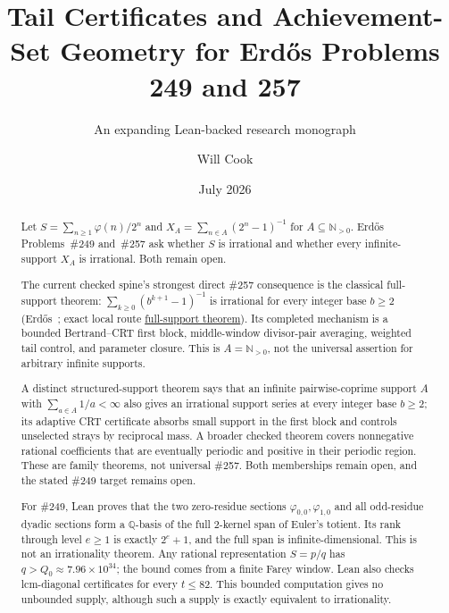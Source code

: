 \documentclass[11pt]{article}
\title{Tail Certificates and Achievement-Set Geometry for Erd\H{o}s Problems 249 and 257}
\subtitle{An expanding Lean-backed research monograph}
\author{Will Cook}
\date{July 2026}
\newcommand{\commit}{bb4e24651b37cd096d3749ef299c3317930b3a3b}
\newcommand{\repobase}{https://github.com/wcook04/plectis-lean-erdos249-257/blob/\commit}
\newcommand{\PK}{Erdos249257}
\newcommand{\lword}[4]{\href{\repobase/\PK/#1\#L#2}{#4}}
\theoremstyle{definition}
\theoremstyle{remark}
\newcommand{\Npos}{\mathbb{N}_{>0}}
\newcommand{\Q}{\mathbb{Q}}
\newcommand{\ph}{\varphi}
\newcommand{\Qzero}{Q_0}
\begin{document}
\maketitle
{}

\begin{abstract}
\noindent
Let $S=\sum_{n\ge1}\ph(n)/2^n$ and
$X_A=\sum_{n\in A}(2^n-1)^{-1}$ for $A\subseteq\Npos$. Erd\H{o}s
Problems~\#249 and~\#257 ask whether $S$ is irrational and whether every
infinite-support $X_A$ is irrational. Both remain open.

The current checked spine's strongest direct \#257 consequence is the classical
full-support theorem: $\sum_{k\ge0}(b^{k+1}-1)^{-1}$ is irrational for every
integer base $b\ge2$ (Erd\H{o}s~\cite{erdos1948}; exact local route
\lword{CertificateKernel.lean}{8328}{irrational_erdosSum_full_support}{full-support theorem}).
Its completed mechanism is a bounded Bertrand--CRT first block, middle-window
divisor-pair averaging, weighted tail control, and parameter closure.  This is
$A=\Npos$, not the universal assertion for arbitrary infinite supports.

A distinct structured-support theorem says that an infinite pairwise-coprime
support $A$ with $\sum_{a\in A}1/a<\infty$ also gives an irrational support
series at every integer base $b\ge2$; its adaptive CRT certificate absorbs
small support in the first block and controls unselected strays by reciprocal
mass.  A broader checked theorem covers nonnegative rational coefficients that
are eventually periodic and positive in their periodic region.  These are
family theorems, not universal \#257.  Both memberships remain open, and the
stated \#249 target remains open.

For \#249, Lean proves that the two zero-residue sections
$\ph_{0,0},\ph_{1,0}$ and all odd-residue dyadic sections form a $\Q$-basis of
the full $2$-kernel span of Euler's totient. Its rank through level $e\ge1$
is exactly $2^e+1$, and the full span is infinite-dimensional. This is not an
irrationality theorem. Any rational representation $S=p/q$ has
$q>\Qzero\approx7.96\times10^{34}$; the bound comes from a finite Farey
window. Lean also checks lcm-diagonal certificates for every $t\le82$. This
bounded computation gives no unbounded supply, although such a supply is
exactly equivalent to irrationality.


\end{abstract}
\end{document}

